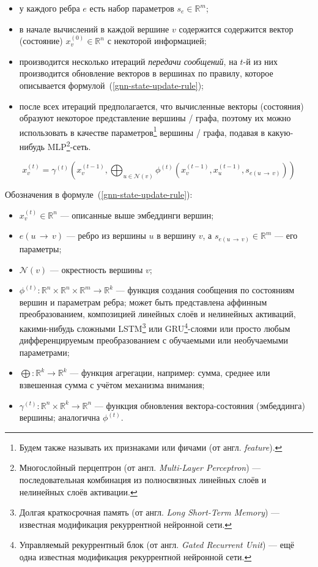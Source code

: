 \begin{itemize}
    \item у каждого ребра $e$ есть набор параметров $s_e \in \mathbb{R}^m$;
    \item в начале вычислений в каждой вершине $v$ содержится содержится вектор (состояние) $x_v^{(0)} \in \mathbb{R}^n$ с некоторой информацией;
    \item производится несколько итераций \textit{передачи сообщений}, на $t$-й из них производится обновление векторов в вершинах по правилу, которое описывается формулой~(\ref{gnn-state-update-rule});
    \item после всех итераций предполагается, что вычисленные векторы (состояния) образуют некоторое представление вершины / графа, поэтому их можно использовать в качестве параметров\footnote{Будем также называть их признаками или фичами (от англ. \textit{feature}).} вершины / графа, подавая в какую-нибудь MLP\footnote{Многослойный перцептрон (от англ. \textit{Multi-Layer Perceptron}) --- последовательная комбинация из полносвязных линейных слоёв и нелинейных слоёв активации.}-сеть.
\end{itemize}

\begin{equation} \label{gnn-state-update-rule}
    x_v^{(t)} = \gamma^{(t)} \left(x_v^{(t - 1)}, \bigoplus_{u \in \mathcal{N}(v)} \phi^{(t)} \left(x_v^{(t - 1)}, x_u^{(t - 1)}, s_{e(u \, \to \, v)} \right) \right)
\end{equation}

Обозначения в формуле~(\ref{gnn-state-update-rule}):

\begin{itemize}
    \item $x_v^{(t)} \in \mathbb{R}^n$ --- описанные выше эмбеддинги вершин;
    \item $e(u \, \to \, v)$ --- ребро из вершины $u$ в вершину $v$, а $s_{e(u \, \to \, v)} \in \mathbb{R}^m$ --- его параметры;
    \item $\mathcal{N}(v)$ --- окрестность вершины $v$;
    \item $\phi^{(t)}: \mathbb{R}^n \times \mathbb{R}^n \times \mathbb{R}^m \to \mathbb{R}^k$ --- функция создания сообщения по состояниям вершин и параметрам ребра; может быть представлена аффинным преобразованием, композицией линейных слоёв и нелинейных активаций, какими-нибудь сложными LSTM\footnote{Долгая краткосрочная память (от англ. \textit{Long Short-Term Memory}) --- известная модификация рекуррентной нейронной сети.} или GRU\footnote{Управляемый рекуррентный блок (от англ. \textit{Gated Recurrent Unit}) --- ещё одна известная модификация рекуррентной нейронной сети.}-слоями или просто любым дифференцируемым преобразованием с обучаемыми или необучаемыми параметрами;
    \item $\bigoplus: \mathbb{R}^k \to \mathbb{R}^k$ --- функция агрегации, например: сумма, среднее или взвешенная сумма с учётом механизма внимания;
    \item $\gamma^{(t)}: \mathbb{R}^n \times \mathbb{R}^k \to \mathbb{R}^n$ --- функция обновления вектора-состояния (эмбеддинга) вершины; аналогична $\phi^{(t)}$.
\end{itemize}

